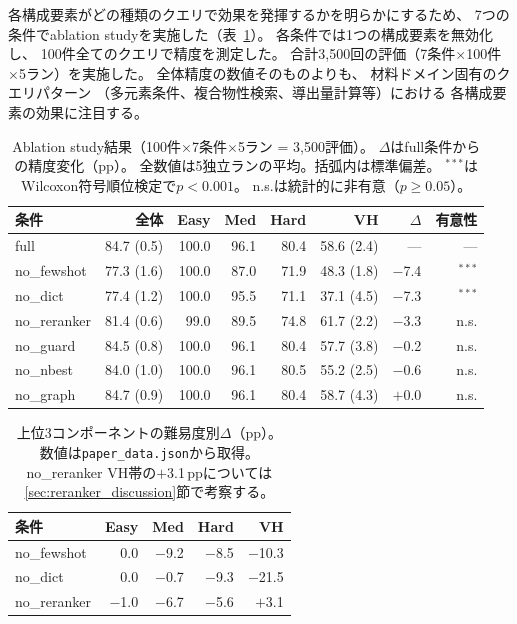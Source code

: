 \documentclass[5p,twocolumn]{elsarticle}
\begin{document}
各構成要素がどの種類のクエリで効果を発揮するかを明らかにするため、
7つの条件でablation studyを実施した（表~\ref{tab:ablation}）。
各条件では1つの構成要素を無効化し、
100件全てのクエリで精度を測定した。
合計3{,}500回の評価（7条件$\times$100件$\times$5ラン）を実施した。
全体精度の数値そのものよりも、
材料ドメイン固有のクエリパターン
（多元素条件、複合物性検索、導出量計算等）における
各構成要素の効果に注目する。

\begin{table}[t]
\centering
\caption{Ablation study結果（100件$\times$7条件$\times$5ラン = 3{,}500評価）。
$\Delta$はfull条件からの精度変化（pp）。
全数値は5独立ランの平均。括弧内は標準偏差。
$^{***}$はWilcoxon符号順位検定で$p<0.001$。
n.s.は統計的に非有意（$p\geq 0.05$）。}
\label{tab:ablation}
\small
\begin{tabular}{@{}lrrrrrrr@{}}
\toprule
条件 & 全体 & Easy & Med & Hard & VH & $\Delta$ & 有意性 \\
\midrule
full          & 84.7 (0.5) & 100.0 & 96.1 & 80.4 & 58.6 (2.4) & ---    & --- \\
no\_fewshot   & 77.3 (1.6) & 100.0 & 87.0 & 71.9 & 48.3 (1.8) & $-$7.4  & $^{***}$ \\
no\_dict      & 77.4 (1.2) & 100.0 & 95.5 & 71.1 & 37.1 (4.5) & $-$7.3  & $^{***}$ \\
no\_reranker  & 81.4 (0.6) & 99.0 & 89.5 & 74.8 & 61.7 (2.2) & $-$3.3  & n.s. \\
no\_guard     & 84.5 (0.8) & 100.0 & 96.1 & 80.4 & 57.7 (3.8) & $-$0.2  & n.s. \\
no\_nbest     & 84.0 (1.0) & 100.0 & 96.1 & 80.5 & 55.2 (2.5) & $-$0.6  & n.s. \\
no\_graph     & 84.7 (0.9) & 100.0 & 96.1 & 80.4 & 58.7 (4.3) & $+$0.0  & n.s. \\
\bottomrule
\end{tabular}
\end{table}

\begin{table}[t]
\centering
\caption{上位3コンポーネントの難易度別$\Delta$（pp）。
数値は\texttt{paper\_data.json}から取得。
no\_reranker VH帯の$+$3.1\,ppについては\ref{sec:reranker_discussion}節で考察する。}
\label{tab:ablation-detail}
\small
\begin{tabular}{@{}lrrrr@{}}
\toprule
条件 & Easy & Med & Hard & VH \\
\midrule
no\_fewshot   &    0.0  & $-$9.2  & $-$8.5  & $-$10.3 \\
no\_dict      &    0.0  & $-$0.7  & $-$9.3  & $-$21.5 \\
no\_reranker  & $-$1.0  & $-$6.7  & $-$5.6  & $+$3.1  \\
\bottomrule
\end{tabular}
\end{table}
\end{document}
